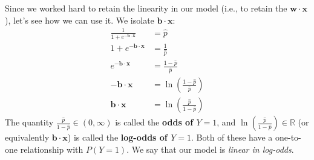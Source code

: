 \documentclass[12pt, a4paper]{article}
\theoremstyle{definition}
\begin{document}
	Since we worked hard to retain the linearity in our model (i.e., to retain the
	$\bm{w}\cdot \bm{x}$), let's see how we can use it. We isolate $\bm{b}\cdot\bm{x}$:
	\begin{align*}
		\frac{1}{1 + e^{-\bm{b}\cdot \bm{x}}}&= \hat{p}\\
		1 + e^{-\bm{b}\cdot \bm{x}} &= \frac{1}{\hat{p}}\\
		e^{-\bm{b}\cdot \bm{x}} &= \frac{1 - \hat{p}}{\hat{p}}\\
		-\bm{b}\cdot\bm{x} &= \ln \left(\frac{1- \hat{p}}{\hat{p}}\right)\\
		\bm{b}\cdot\bm{x} &= \ln\left(\frac{\hat{p}}{1 - \hat{p}}\right)
	\end{align*}
	The quantity $\frac{\hat{p}}{1 - \hat{p}}\in (0,\infty)$ is called the \textbf{odds of $Y=1$},
	and $\ln\left(\frac{\hat{p}}{1 - \hat{p}}\right)\in \mathbb{R}$
	(or equivalently $\bm{b}\cdot\bm{x}$) is called the \textbf{log-odds
	of $Y=1$}. Both of these have a one-to-one relationship with $P(Y = 1)$.
	We say that our model is \textit{linear in log-odds}.
	
\end{document}

